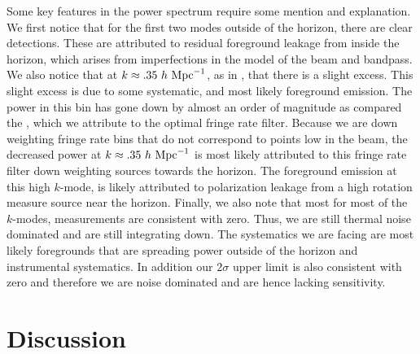 \documentclass[twocolumn,numberedappendix]{emulateapj} \shorttitle{PSA64}
\begin{document}
Some key features in the power spectrum require some mention and explanation. We
first notice that for the first two modes outside of the horizon, there are
clear detections. These are attributed to residual foreground leakage from
inside the horizon, which arises from imperfections in the model of the beam and
bandpass. We also notice that at $k\approx{.35}\ h\ {\rm Mpc}^{-1}$, as in
\cite{parsons_et_al2014}, that there is a slight excess. This slight excess is
due to some systematic, and most likely foreground emission. The power in this
bin has gone down by almost an order of magnitude as compared the
\cite{parsons_et_al2014}, which we attribute to the optimal fringe rate filter.
Because we are down weighting fringe rate bins that do not correspond to points
low in the beam, the decreased power at $k\approx{.35}\ h\ {\rm Mpc}^{-1}$ is
most likely attributed to this fringe rate filter down weighting sources towards
the horizon. The foreground emission at this high $k$-mode, is likely attributed
to polarization leakage from a high rotation measure source near the horizon.
Finally, we also note that most for most of the $k$-modes, measurements are
consistent with zero. Thus, we are still thermal noise dominated and are still
integrating down. The systematics we are facing are most likely foregrounds that
are spreading power outside of the horizon and instrumental systematics. In
addition our $2\sigma$ upper limit is also consistent with zero and therefore we
are noise dominated and are hence lacking sensitivity.

\section{Discussion}


%
\end{document}
